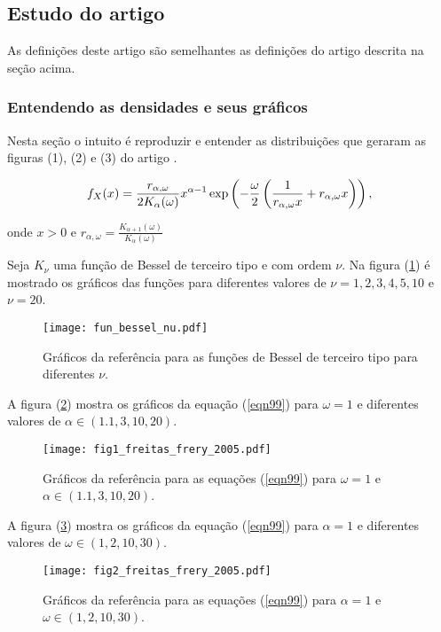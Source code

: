 \subsection{Estudo do artigo  \cite{ffc}}

As definições deste artigo são semelhantes as definições do artigo \cite{ade} descrita na seção acima. 

\subsubsection{ Entendendo as densidades e seus gráficos}

Nesta seção o intuito é reproduzir e entender as distribuições que geraram as figuras (1), (2) e (3) do artigo \cite{ffc}. 

\begin{equation}\label{eqn99}
	f_{X}(x)=\frac{r_{\alpha,\omega}}{2K_{\alpha}(\omega)}x^{\alpha-1}\exp\left(-\frac{\omega}{2}\left(\frac{1}{r_{\alpha,\omega}x}+ r_{\alpha,\omega}x\right)\right), \\
\end{equation}

onde $x>0$  e $r_{\alpha,\omega}=\frac{K_{\alpha+1}(\omega)}{K_{\alpha}(\omega)}$

Seja $K_{\nu}$ uma função de Bessel de terceiro tipo e com ordem $\nu$. Na figura (\ref{fig4}) é mostrado os gráficos das funções para diferentes valores de $\nu=1,2,3,4,5,10$ e $\nu=20$. 
\begin{figure}[!htb]
\centering
\texttt{[image: fun\_bessel\_nu.pdf]}
	\caption{Gráficos da referência \cite{ffc} para as funções de Bessel de terceiro tipo para diferentes $\nu$.}
\label{fig4}
\end{figure}

A figura (\ref{fig5}) mostra os gráficos da equação (\ref{eqn99}) para $\omega=1$ e diferentes valores de $\alpha\in(1.1,3,10,20)$. 

\begin{figure}[!htb]
\centering
\texttt{[image: fig1\_freitas\_frery\_2005.pdf]}
	\caption{Gráficos da referência \cite{ffc} para as equações (\ref{eqn99}) para $\omega=1$ e $\alpha\in(1.1,3,10,20)$.}
\label{fig5}
\end{figure}

A figura (\ref{fig6}) mostra os gráficos da equação (\ref{eqn99}) para $\alpha=1$ e diferentes valores de $\omega\in(1,2,10,30)$. 

\begin{figure}[!htb]
\centering
\texttt{[image: fig2\_freitas\_frery\_2005.pdf]}
	\caption{Gráficos da referência \cite{ffc} para as equações (\ref{eqn99}) para $\alpha=1$ e $\omega\in(1,2,10,30)$.}
\label{fig6}
\end{figure}

